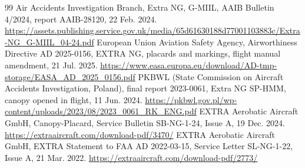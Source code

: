 \documentclass{ideathon2026}
\begin{document}
\setcounter{section}{6}
\begin{thebibliography}{99}
 Air Accidents Investigation Branch, \textquotedbl{}Extra NG, G-MIIL,\textquotedbl{} AAIB Bulletin 4/2024, report AAIB-28120, 22 Feb. 2024. \url{https://assets.publishing.service.gov.uk/media/65d61630188d77001103883c/Extra-NG_G-MIIL_04-24.pdf}
 European Union Aviation Safety Agency, Airworthiness Directive AD 2025-0156, EXTRA NG, placards and markings, flight manual amendment, 21 Jul. 2025. \url{https://www.easa.europa.eu/download/AD-tmp-storage/EASA_AD_2025_0156.pdf}
 PKBWL (State Commission on Aircraft Accidents Investigation, Poland), final report 2023-0061, Extra NG SP-HMM, canopy opened in flight, 11 Jun. 2024. \url{https://pkbwl.gov.pl/wp-content/uploads/2023/08/2023_0061_RK_ENG.pdf}
 EXTRA Aerobatic Aircraft GmbH, \textquotedbl{}Canopy-Placard,\textquotedbl{} Service Bulletin SB-NG-1-24, Issue A, 19 Dec. 2024. \url{https://extraaircraft.com/download-pdf/3470/}
 EXTRA Aerobatic Aircraft GmbH, \textquotedbl{}EXTRA Statement to FAA AD 2022-03-15,\textquotedbl{} Service Letter SL-NG-1-22, Issue A, 21 Mar. 2022. \url{https://extraaircraft.com/download-pdf/2773/}
\end{thebibliography}
\end{document}
